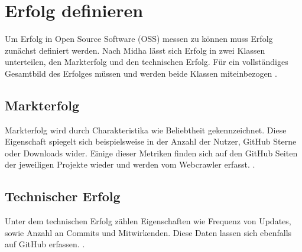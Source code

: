 \section{Erfolg definieren}


Um Erfolg in Open Source Software (OSS) messen zu können muss Erfolg zunächst definiert werden.
Nach Midha lässt sich Erfolg in zwei Klassen unterteilen, den Markterfolg und den technischen Erfolg.
Für ein vollständiges Gesamtbild des Erfolges müssen und werden beide Klassen miteinbezogen
\cite{midhaFactorsAffectingSuccess2012}. %

\subsection{Markterfolg}

Markterfolg wird durch Charakteristika wie Beliebtheit gekennzeichnet.
Diese Eigenschaft spiegelt sich beispielsweise in der Anzahl der Nutzer, GitHub Sterne oder 
Downloads wider. Einige dieser Metriken finden sich auf den GitHub Seiten
der jeweiligen Projekte wieder und werden vom Webcrawler erfasst. 
\cite{midhaFactorsAffectingSuccess2012}. %

\subsection{Technischer Erfolg}

Unter dem technischen Erfolg zählen Eigenschaften wie Frequenz von Updates,
sowie Anzahl an Commits und Mitwirkenden. Diese Daten lassen sich ebenfalls auf GitHub erfassen.
\cite{midhaFactorsAffectingSuccess2012}. %
